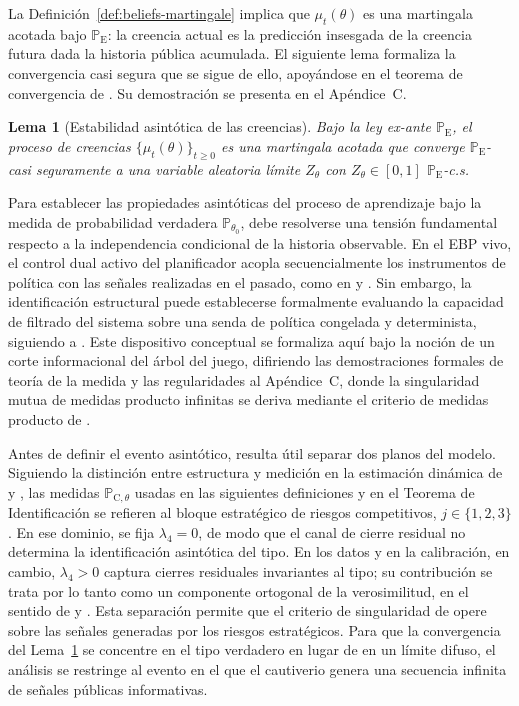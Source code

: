 \documentclass[review,authoryear,12pt]{elsarticle}
\theoremstyle{plain}
\newtheorem{lemma}[theorem]{Lema}
\theoremstyle{definition}
\newcommand{\ProbE}{\mathbb{P}_{\mathrm{E}}}
\newcommand{\ProbC}[1]{\mathbb{P}_{\mathrm{C},#1}}
\newcommand{\1}{\mathbf{1}}
\begin{document}
La Definición~\ref{def:beliefs-martingale} implica que $\mu_t(\theta)$ es una martingala acotada bajo $\ProbE$: la creencia actual es la predicción insesgada de la creencia futura dada la historia pública acumulada. El siguiente lema formaliza la convergencia casi segura que se sigue de ello, apoyándose en el teorema de convergencia de \citet{Doob1953Stochastic}. Su demostración se presenta en el Apéndice~C.

\begin{lemma}[Estabilidad asintótica de las creencias]\label{lem:asymptotic-beliefs}
Bajo la ley ex-ante $\ProbE$, el proceso de creencias $\{\mu_t(\theta)\}_{t\ge 0}$ es una martingala acotada que converge $\ProbE$-casi seguramente a una variable aleatoria límite $Z_\theta$ con $Z_\theta\in[0,1]$ $\ProbE$-c.s.
\end{lemma}

\smallskip

Para establecer las propiedades asintóticas del proceso de aprendizaje bajo la medida de probabilidad verdadera $\mathbb{P}_{\theta_0}$, debe resolverse una tensión fundamental respecto a la independencia condicional de la historia observable. En el EBP vivo, el control dual activo del planificador acopla secuencialmente los instrumentos de política con las señales realizadas en el pasado, como en \citet{AghionBoltonHarrisJullien1991} y \citet{EasleyKiefer1988}. Sin embargo, la identificación estructural puede establecerse formalmente evaluando la capacidad de filtrado del sistema sobre una senda de política congelada y determinista, siguiendo a \citet{BlackwellDubins1962}. Este dispositivo conceptual se formaliza aquí bajo la noción de un corte informacional del árbol del juego, difiriendo las demostraciones formales de teoría de la medida y las regularidades al Apéndice~C, donde la singularidad mutua de medidas producto infinitas se deriva mediante el criterio de medidas producto de \citet{Kakutani1948}.

Antes de definir el evento asintótico, resulta útil separar dos planos del modelo. Siguiendo la distinción entre estructura y medición en la estimación dinámica de \citet{Rust1987} y \citet{MagnacThesmar2002}, las medidas $\ProbC{\theta}$ usadas en las siguientes definiciones y en el Teorema de Identificación se refieren al bloque estratégico de riesgos competitivos, $j\in\{1,2,3\}$. En ese dominio, se fija $\lambda_4=0$, de modo que el canal de cierre residual no determina la identificación asintótica del tipo. En los datos y en la calibración, en cambio, $\lambda_4>0$ captura cierres residuales invariantes al tipo; su contribución se trata por lo tanto como un componente ortogonal de la verosimilitud, en el sentido de \citet{Lancaster1990} y \citet{AbbringVanDenBerg2003}. Esta separación permite que el criterio de singularidad de \citet{Kakutani1948} opere sobre las señales generadas por los riesgos estratégicos. Para que la convergencia del Lema~\ref{lem:asymptotic-beliefs} se concentre en el tipo verdadero en lugar de en un límite difuso, el análisis se restringe al evento en el que el cautiverio genera una secuencia infinita de señales públicas informativas.
\end{document}
